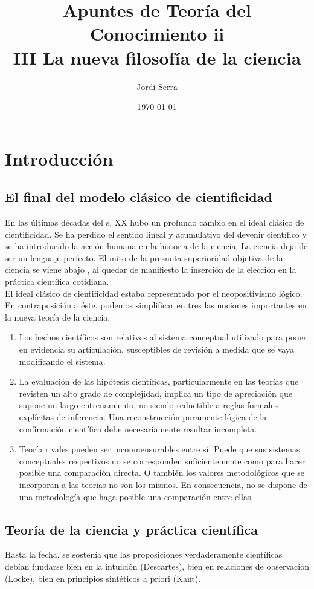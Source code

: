 \documentclass[a4paper, 11pt, twocolumn, spanish]{article}
\author{Jordi Serra}
\date{\today}
\title{Apuntes de Teoría del Conocimiento ii\\\medskip
\large III La nueva filosofía de la ciencia}
\begin{document}
\maketitle
\tableofcontents


\section{Introducción}
\label{sec:org2a665ad}
\subsection{El final del modelo clásico de cientificidad}
\label{sec:orgd23626e}
En las últimas décadas del s. XX hubo un profundo cambio en el ideal
clásico de cientificidad. Se ha perdido el sentido lineal y
acumulativo del devenir científico y se ha introducido la acción
humana en la historia de la ciencia. La ciencia deja de ser un
lenguaje perfecto. El mito de la presunta superioridad objetiva de la
ciencia se viene abajo , al quedar de manifiesto la inserción de la
elección en la práctica científica cotidiana.\\

El ideal clásico de cientificidad estaba representado por el
neopositivismo lógico. En contraposición a éste, podemos simplificar
en tres las nociones importantes en la nueva teoría de la ciencia.
\begin{enumerate}
\item Los hechos científicos son relativos al sistema conceptual
utilizado para poner en evidencia su articulación, susceptibles de revisión a medida que se vaya modificando el sistema.
\item La evaluación de las hipótesis científicas, particularmente en
las teorías que revisten un alto grado de complejidad, implica un
tipo de apreciación que supone un largo entrenamiento, no siendo
reductible a reglas formales explícitas de inferencia. Una
reconstrucción puramente lógica de la confirmación científica
debe necesariamente resultar incompleta.
\item Teoría rivales pueden ser inconmensurables entre sí. Puede que
sus sistemas conceptuales respectivos no se corresponden
suficientemente como para hacer posible una comparación
directa. O también los valores metodológicos que se incorporan a
las teorías no son los mismos. En consecuencia, no se dispone de
una metodología que haga posible una comparación entre ellas.
\end{enumerate}

\subsection{Teoría de la ciencia y práctica científica}
\label{sec:orgf616d03}
Hasta la fecha, se sostenía que las proposiciones verdaderamente
científicas debían fundarse bien en la intuición (Descartes), bien en
relaciones de observación (Locke), bien en principios sintéticos a
priori (Kant).\\
\end{document}
